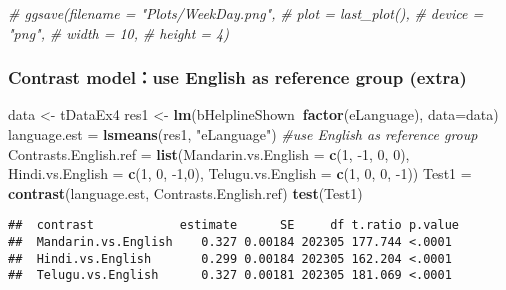 \documentclass[]{article}
\newenvironment{Shaded}{\begin{snugshade}}{\end{snugshade}}
\newcommand{\CommentTok}[1]{\textcolor[rgb]{0.56,0.35,0.01}{\textit{#1}}}
\newcommand{\DataTypeTok}[1]{\textcolor[rgb]{0.13,0.29,0.53}{#1}}
\newcommand{\DecValTok}[1]{\textcolor[rgb]{0.00,0.00,0.81}{#1}}
\newcommand{\KeywordTok}[1]{\textcolor[rgb]{0.13,0.29,0.53}{\textbf{#1}}}
\newcommand{\NormalTok}[1]{#1}
\newcommand{\OperatorTok}[1]{\textcolor[rgb]{0.81,0.36,0.00}{\textbf{#1}}}
\newcommand{\StringTok}[1]{\textcolor[rgb]{0.31,0.60,0.02}{#1}}
\begin{document}
\begin{Shaded}
\begin{Highlighting}[]
\CommentTok{# ggsave(filename = "Plots/WeekDay.png",}
\CommentTok{#        plot = last_plot(),}
\CommentTok{#        device = "png",}
\CommentTok{#        width = 10,}
\CommentTok{#        height = 4)}
\end{Highlighting}
\end{Shaded}

\hypertarget{contrast-modeluse-english-as-reference-group-extra}{%
\subsubsection{Contrast model：use English as reference group
(extra)}\label{contrast-modeluse-english-as-reference-group-extra}}

\begin{Shaded}
\begin{Highlighting}[]
\NormalTok{data <-}\StringTok{ }\NormalTok{tDataEx4}
\NormalTok{res1 <-}\StringTok{ }\KeywordTok{lm}\NormalTok{(bHelplineShown}\OperatorTok{~}\KeywordTok{factor}\NormalTok{(eLanguage), }\DataTypeTok{data=}\NormalTok{data)}
\NormalTok{language.est =}\StringTok{ }\KeywordTok{lsmeans}\NormalTok{(res1, }\StringTok{"eLanguage"}\NormalTok{)}
\CommentTok{#use English as reference group}
\NormalTok{Contrasts.English.ref =}\StringTok{ }\KeywordTok{list}\NormalTok{(}\DataTypeTok{Mandarin.vs.English =} \KeywordTok{c}\NormalTok{(}\DecValTok{1}\NormalTok{, }\DecValTok{-1}\NormalTok{, }\DecValTok{0}\NormalTok{, }\DecValTok{0}\NormalTok{), }\DataTypeTok{Hindi.vs.English =} \KeywordTok{c}\NormalTok{(}\DecValTok{1}\NormalTok{, }\DecValTok{0}\NormalTok{, }\DecValTok{-1}\NormalTok{,}\DecValTok{0}\NormalTok{), }\DataTypeTok{Telugu.vs.English =} \KeywordTok{c}\NormalTok{(}\DecValTok{1}\NormalTok{, }\DecValTok{0}\NormalTok{, }\DecValTok{0}\NormalTok{, }\DecValTok{-1}\NormalTok{))}
\NormalTok{Test1 =}\StringTok{ }\KeywordTok{contrast}\NormalTok{(language.est, Contrasts.English.ref)}
\KeywordTok{test}\NormalTok{(Test1)}
\end{Highlighting}
\end{Shaded}

\begin{verbatim}
##  contrast            estimate      SE     df t.ratio p.value
##  Mandarin.vs.English    0.327 0.00184 202305 177.744 <.0001 
##  Hindi.vs.English       0.299 0.00184 202305 162.204 <.0001 
##  Telugu.vs.English      0.327 0.00181 202305 181.069 <.0001
\end{verbatim}
\end{document}
